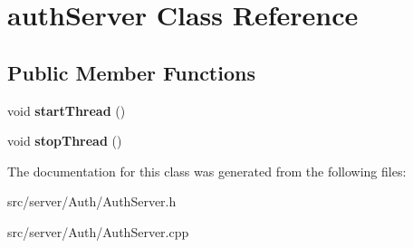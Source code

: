 \hypertarget{classauth_server}{\section{auth\-Server Class Reference}
\label{classauth_server}
}
\subsection*{Public Member Functions}
\begin{DoxyCompactItemize}
\item 
\hypertarget{classauth_server_ac406ba141a6f86f0f5bffe5542492188}{void {\bfseries start\-Thread} ()}\label{classauth_server_ac406ba141a6f86f0f5bffe5542492188}

\item 
\hypertarget{classauth_server_a4b76b1c2e6422d27671b7ea3e59d8910}{void {\bfseries stop\-Thread} ()}\label{classauth_server_a4b76b1c2e6422d27671b7ea3e59d8910}

\end{DoxyCompactItemize}


The documentation for this class was generated from the following files\-:\begin{DoxyCompactItemize}
\item 
src/server/\-Auth/Auth\-Server.\-h\item 
src/server/\-Auth/Auth\-Server.\-cpp\end{DoxyCompactItemize}
